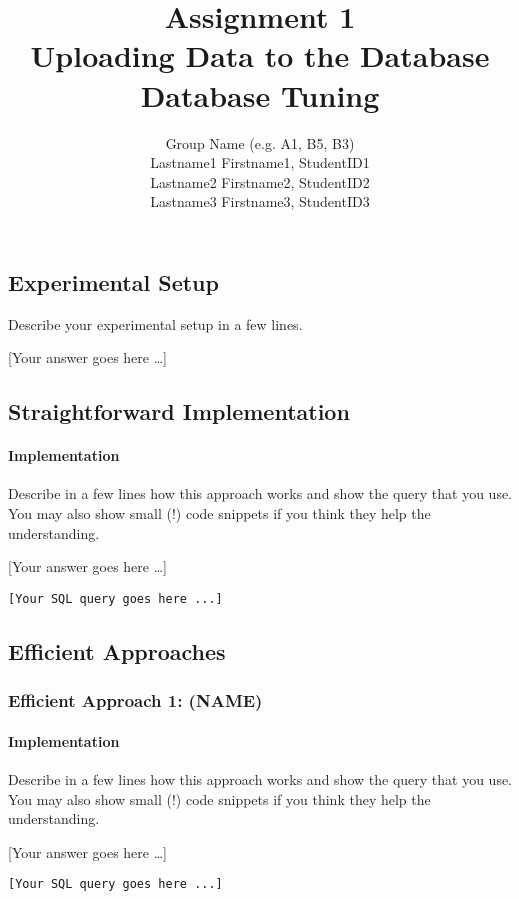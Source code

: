 \documentclass[11pt]{scrartcl}
\title{
  \textbf{\large Assignment 1} \\
  Uploading Data to the Database \\
  {\large Database Tuning}}
\author{
  Group Name (e.g. A1, B5, B3) \\
  \large Lastname1 Firstname1, StudentID1 \\
  \large Lastname2 Firstname2, StudentID2 \\
  \large Lastname3 Firstname3, StudentID3
}
\newcommand{\youranswerhere}{[Your answer goes here \ldots]}
\begin{document}
\maketitle

\subsection*{Experimental Setup}

Describe your experimental setup in a few lines.

\youranswerhere{}

\subsection*{Straightforward Implementation}

\paragraph{Implementation}

Describe in a few lines how this approach works and show the query that you use. You may also show small (!) code snippets if you think they help the understanding.

\youranswerhere{}

\begin{lstlisting}[style=dbtsql]
[Your SQL query goes here ...]
\end{lstlisting}

\subsection*{Efficient Approaches}

\subsubsection*{Efficient Approach 1: (NAME)}

\paragraph{Implementation}

Describe in a few lines how this approach works and show the query that you use. You may also show small (!) code snippets if you think they help the understanding.

\youranswerhere{}

\begin{lstlisting}[style=dbtsql]
[Your SQL query goes here ...]
\end{lstlisting}
\end{document}
